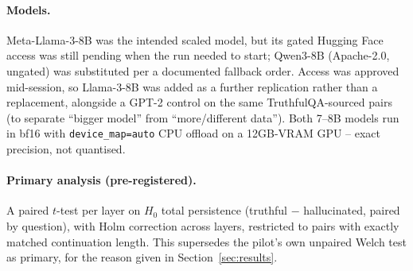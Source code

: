 \paragraph{Models.} Meta-Llama-3-8B was the intended scaled model, but its
gated Hugging Face access was still pending when the run needed to start;
Qwen3-8B (Apache-2.0, ungated) was substituted per a documented fallback
order. Access was approved mid-session, so Llama-3-8B was added as a
further replication rather than a replacement, alongside a GPT-2 control
on the same TruthfulQA-sourced pairs (to separate ``bigger model'' from
``more/different data''). Both 7--8B models run in bf16 with
\texttt{device\_map=auto} CPU offload on a 12GB-VRAM GPU -- exact
precision, not quantised.

\paragraph{Primary analysis (pre-registered).} A paired $t$-test per layer
on $H_0$ total persistence (truthful $-$ hallucinated, paired by
question), with Holm correction across layers, restricted to pairs with
exactly matched continuation length. This supersedes the pilot's own
unpaired Welch test as primary, for the reason given in
Section~\ref{sec:results}.
